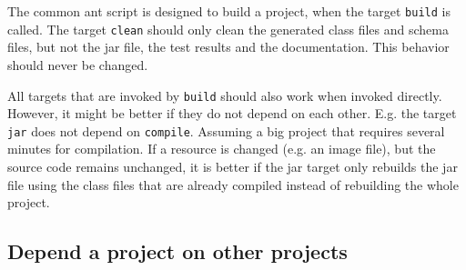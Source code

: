 \documentclass[a4paper,twoside,11pt,bibtotoc]{article}
\begin{document}
The common ant script is designed to build a project, when the target \texttt{build} is called.
The target \texttt{clean} should only clean the generated class files and schema files, but not the jar file, the test results and the documentation.
This behavior should never be changed.

All targets that are invoked by \texttt{build} should also work when invoked directly.
However, it might be better if they do not depend on each other.
E.g. the target \texttt{jar} does not depend on \texttt{compile}.
Assuming a big project that requires several minutes for compilation.
If a resource is changed (e.g. an image file), but the source code remains unchanged, it is better if the jar target only rebuilds the jar file using the class files that are already compiled instead of rebuilding the whole project.




\subsection{Depend a project on other projects}
\label{sec:dependency}

\clearpage
 
%
%
%
\end{document}
